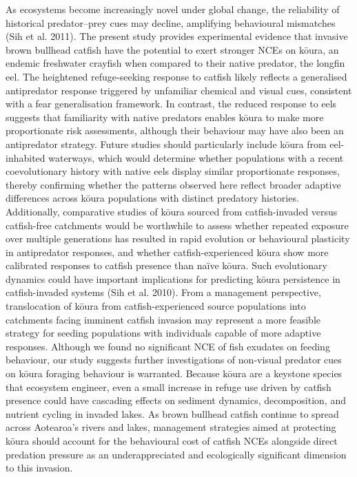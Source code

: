 \documentclass[
  12pt,
  a4paper,
]{scrbook}
\begin{document}
As ecosystems become increasingly novel under global change, the
reliability of historical predator--prey cues may decline, amplifying
behavioural mismatches (Sih et al. 2011). The present study provides
experimental evidence that invasive brown bullhead catfish have the
potential to exert stronger NCEs on kōura, an endemic freshwater
crayfish when compared to their native predator, the longfin eel. The
heightened refuge-seeking response to catfish likely reflects a
generalised antipredator response triggered by unfamiliar chemical and
visual cues, consistent with a fear generalisation framework. In
contrast, the reduced response to eels suggests that familiarity with
native predators enables kōura to make more proportionate risk
assessments, although their behaviour may have also been an antipredator
strategy. Future studies should particularly include kōura from
eel-inhabited waterways, which would determine whether populations with
a recent coevolutionary history with native eels display similar
proportionate responses, thereby confirming whether the patterns
observed here reflect broader adaptive differences across kōura
populations with distinct predatory histories. Additionally, comparative
studies of kōura sourced from catfish-invaded versus catfish-free
catchments would be worthwhile to assess whether repeated exposure over
multiple generations has resulted in rapid evolution or behavioural
plasticity in antipredator responses, and whether catfish-experienced
kōura show more calibrated responses to catfish presence than naïve
kōura. Such evolutionary dynamics could have important implications for
predicting kōura persistence in catfish-invaded systems (Sih et al.
2010). From a management perspective, translocation of kōura from
catfish-experienced source populations into catchments facing imminent
catfish invasion may represent a more feasible strategy for seeding
populations with individuals capable of more adaptive responses.
Although we found no significant NCE of fish exudates on feeding
behaviour, our study suggests further investigations of non-visual
predator cues on kōura foraging behaviour is warranted. Because kōura
are a keystone species that ecosystem engineer, even a small increase in
refuge use driven by catfish presence could have cascading effects on
sediment dynamics, decomposition, and nutrient cycling in invaded lakes.
As brown bullhead catfish continue to spread across Aotearoa's rivers
and lakes, management strategies aimed at protecting kōura should
account for the behavioural cost of catfish NCEs alongside direct
predation pressure as an underappreciated and ecologically significant
dimension to this invasion.
\end{document}
